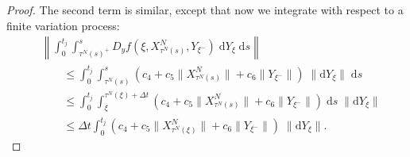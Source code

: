 \documentclass[reqno,12pt]{amsart}
\theoremstyle{plain} %
\theoremstyle{definition} %
\begin{document}
\begin{proof}
    The second term is similar, except that now we integrate with respect to a finite variation process:
    \begin{align*}
        & \left\|\int_0^{t_j} \int_{\tau^N(s)^+}^s D_y f(\xi, X_{\tau^N(s)}^N, Y_{\xi^-}) \;\mathrm{d}Y_\xi\;\mathrm{d}s\right\| \\
        & \qquad \leq \int_0^{t_j} \int_{\tau^N(s)}^s \left(c_4 + c_5 \|X_{\tau^N(s)}^N\| + c_6\|Y_{\xi^-}\|\right)\;\|\mathrm{d}Y_\xi\|\;\mathrm{d}s \\
        & \qquad \leq \int_0^{t_j} \int_{\xi}^{\tau^N(\xi) + \Delta t} \left(c_4 + c_5 \|X_{\tau^N(s)}^N\| + c_6\|Y_{\xi^-}\|\right)\;\mathrm{d}s\;\|\mathrm{d}Y_\xi\| \\
        & \qquad \leq \Delta t \int_0^{t_j} \left(c_4 + c_5 \|X_{\tau^N(\xi)}^N\| + c_6\|Y_{\xi^-}\|\right)\;\|\mathrm{d}Y_\xi\|.
    \end{align*}


\end{proof}
\end{document}

